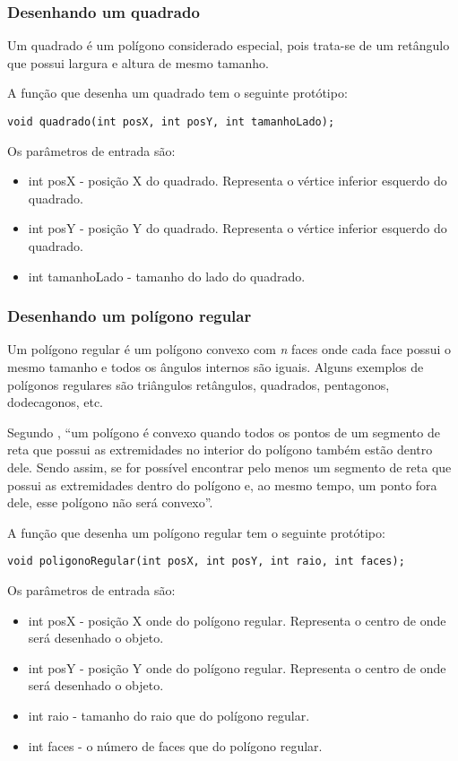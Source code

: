 \documentclass[12pt, %
openright,
oneside, %
a4paper,    %
brazil]{facom-ufu-abntex2}
\begin{document}
\subsubsection{Desenhando um quadrado}
Um quadrado é um polígono considerado especial, pois trata-se de um retângulo que possui largura e altura de mesmo tamanho.

A função que desenha um quadrado tem o seguinte protótipo:

\begin{verbatim}
void quadrado(int posX, int posY, int tamanhoLado);
\end{verbatim}

Os parâmetros de entrada são:

\begin{itemize}
    \item int posX - posição X do quadrado. Representa o vértice inferior esquerdo do quadrado.
    \item int posY - posição Y do quadrado. Representa o vértice inferior esquerdo do quadrado.
    \item int tamanhoLado - tamanho do lado do quadrado.
\end{itemize}

\subsubsection{Desenhando um polígono regular}
Um polígono regular é um polígono convexo com \textit{n} faces onde cada face possui o mesmo tamanho e todos os ângulos internos são iguais. Alguns exemplos de polígonos regulares são triângulos retângulos, quadrados, pentagonos, dodecagonos, etc.

Segundo , ``um polígono é convexo quando todos os pontos de um segmento de reta que possui as extremidades no interior do polígono também estão dentro dele. Sendo assim, se for possível encontrar pelo menos um segmento de reta que possui as extremidades dentro do polígono e, ao mesmo tempo, um ponto fora dele, esse polígono não será convexo''.

A função que desenha um polígono regular tem o seguinte protótipo:

\begin{verbatim}
void poligonoRegular(int posX, int posY, int raio, int faces);
\end{verbatim}

Os parâmetros de entrada são:

\begin{itemize}
    \item int posX - posição X onde do polígono regular. Representa o centro de onde será desenhado o objeto.
    \item int posY - posição Y onde do polígono regular. Representa o centro de onde será desenhado o objeto.
    \item int raio - tamanho do raio que do polígono regular.
    \item int faces - o número de faces que do polígono regular.
\end{itemize}
\end{document}
